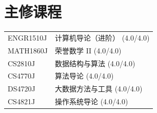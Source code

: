 
\section{主修课程}
\begin{tabularx}{\linewidth}{@{}l X@{}}	
ENGR1510J & 计算机导论（进阶） \hfill \normalsize (4.0/4.0)\\
MATH1860J & 荣誉数学 II \hfill \normalsize (4.0/4.0)\\
CS2810J & 数据结构与算法 \hfill \normalsize (4.0/4.0)\\
CS4770J & 算法导论 \hfill \normalsize (4.0/4.0)\\
DS4720J & 大数据方法与工具 \hfill \normalsize (4.0/4.0)\\
CS4821J & 操作系统导论 \hfill \normalsize (4.0/4.0)
\end{tabularx}

